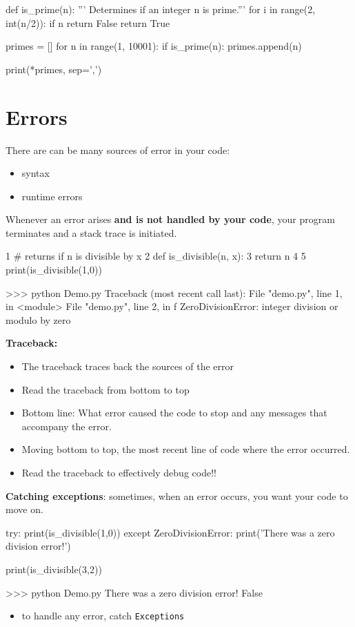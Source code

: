 \documentclass[12pt]{article}
\numberwithin{equation}{section}
\begin{document}
\begin{python}
def is_prime(n):
	''' Determines if an integer n is prime.'''
    for i in range(2, int(n/2)):
        if n%
            return False
    return True

primes = []
for n in range(1, 10001):
    if is_prime(n):
        primes.append(n)

print(*primes, sep=',')
\end{python}

\section{Errors}
There are can be many sources of error in your code:
\begin{itemize}
    \item syntax
    \item runtime errors
\end{itemize}
Whenever an error arises \textbf{and is not handled by your code}, your program terminates and a stack trace is initiated.

\begin{python}
1 # returns if n is divisible by x
2 def is_divisible(n, x):
3 	return n%
4 
5 print(is_divisible(1,0))

>>> python Demo.py
Traceback (most recent call last):
  File "demo.py", line 1, in <module>
  File "demo.py", line 2, in f
ZeroDivisionError: integer division or modulo by zero
\end{python}

\textbf{Traceback:}
\begin{itemize}
    \item The traceback traces back the sources of the error
    \item Read the traceback from bottom to top
    \item Bottom line: What error caused the code to stop and any messages that accompany the error. 
    \item Moving bottom to top, the most recent line of code where the error occurred.
    \item Read the traceback to effectively debug code!!
\end{itemize}

\textbf{Catching exceptions}: sometimes, when an error occurs, you want your code to move on.
\begin{python}
try:
    print(is_divisible(1,0))
except ZeroDivisionError:
    print('There was a zero division error!')

print(is_divisible(3,2))

>>> python Demo.py
There was a zero division error! 
False
\end{python}
\begin{itemize}
    \item to handle any error, catch \verb|Exceptions|
\end{itemize}
\end{document}
